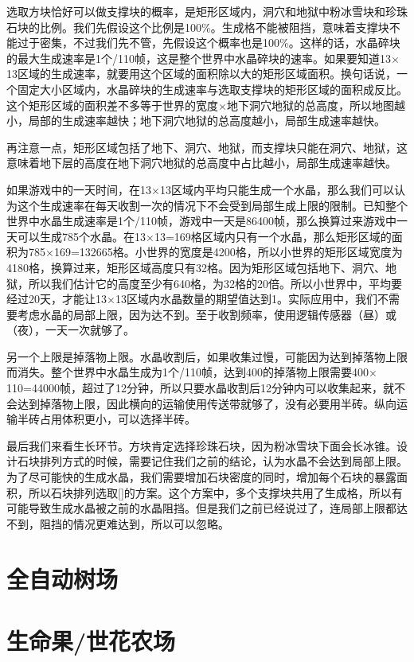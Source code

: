 选取方块恰好可以做支撑块的概率，是矩形区域内，洞穴和地狱中粉冰雪块和珍珠石块的比例。我们先假设这个比例是100\%。生成格不能被阻挡，意味着支撑块不能过于密集，不过我们先不管，先假设这个概率也是100\%。这样的话，水晶碎块的最大生成速率是1个/110帧，这是整个世界中水晶碎块的速率。如果要知道13$\times$13区域的生成速率，就要用这个区域的面积除以大的矩形区域面积。换句话说，一个固定大小区域内，水晶碎块的生成速率与选取支撑块的矩形区域的面积成反比。这个矩形区域的面积差不多等于世界的宽度$\times$地下洞穴地狱的总高度，所以地图越小，局部的生成速率越快；地下洞穴地狱的总高度越小，局部生成速率越快。

再注意一点，矩形区域包括了地下、洞穴、地狱，而支撑块只能在洞穴、地狱，这意味着地下层的高度在地下洞穴地狱的总高度中占比越小，局部生成速率越快。

如果游戏中的一天时间，在13$\times$13区域内平均只能生成一个水晶，那么我们可以认为这个生成速率在每天收割一次的情况下不会受到局部生成上限的限制。已知整个世界中水晶生成速率是1个/110帧，游戏中一天是86400帧，那么换算过来游戏中一天可以生成785个水晶。在13$\times$13=169格区域内只有一个水晶，那么矩形区域的面积为785$\times$169=132665格。小世界的宽度是4200格，所以小世界的矩形区域宽度为4180格，换算过来，矩形区域高度只有32格。因为矩形区域包括地下、洞穴、地狱，所以我们估计它的高度至少有640格，为32格的20倍。所以小世界中，平均要经过20天，才能让13$\times$13区域内水晶数量的期望值达到1。实际应用中，我们不需要考虑水晶的局部上限，因为达不到。至于收割频率，使用逻辑传感器（昼）或（夜），一天一次就够了。

另一个上限是掉落物上限。水晶收割后，如果收集过慢，可能因为达到掉落物上限而消失。整个世界中水晶生成为1个/110帧，达到400的掉落物上限需要400$\times$110=44000帧，超过了12分钟，所以只要水晶收割后12分钟内可以收集起来，就不会达到掉落物上限，因此横向的运输使用传送带就够了，没有必要用半砖。纵向运输半砖占用体积更小，可以选择半砖。

最后我们来看生长环节。方块肯定选择珍珠石块，因为粉冰雪块下面会长冰锥。设计石块排列方式的时候，需要记住我们之前的结论，认为水晶不会达到局部上限。为了尽可能快的生成水晶，我们需要增加石块密度的同时，增加每个石块的暴露面积，所以石块排列选取\autoref{}的方案。这个方案中，多个支撑块共用了生成格，所以有可能导致生成水晶被之前的水晶阻挡。但是我们之前已经说过了，连局部上限都达不到，阻挡的情况更难达到，所以可以忽略。

\section{全自动树场}

\section{生命果/世花农场}

